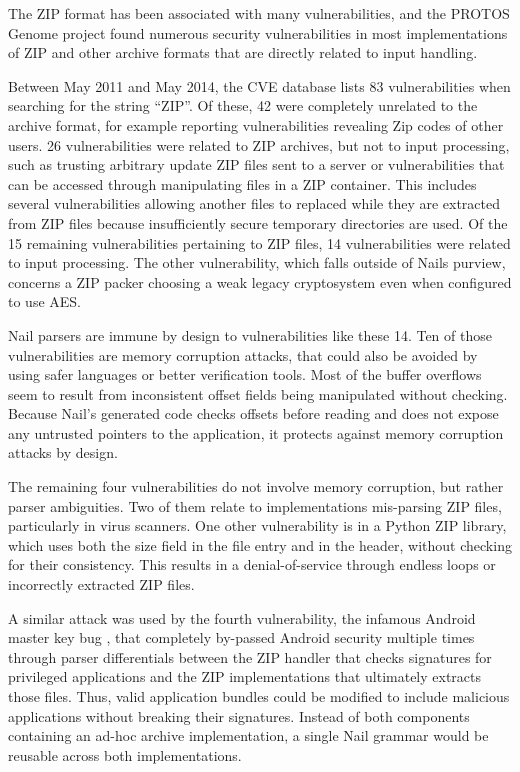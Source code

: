 The ZIP format has been associated with many vulnerabilities, and the PROTOS Genome project found numerous
security vulnerabilities in most implementations of ZIP and other archive formats that are directly
related to input handling.

Between May 2011 and May 2014, the CVE database\cite{cve-database} lists 83 vulnerabilities when searching for the
string ``ZIP''. Of these, 42 were completely unrelated to the archive format, for example reporting
vulnerabilities revealing Zip codes of other users. 26 vulnerabilities were related to ZIP archives,
but not to input processing, such as trusting arbitrary update ZIP files sent to a server or
vulnerabilities that can be accessed through manipulating files in a ZIP container. This includes
several vulnerabilities allowing another files to replaced while they are extracted from ZIP
files because insufficiently secure temporary directories are used. Of the 15 remaining
vulnerabilities pertaining to ZIP files, 14 vulnerabilities were related to input processing. The
 other vulnerability, which falls outside of Nails purview, concerns a ZIP packer choosing a weak
 legacy cryptosystem even when configured to use AES.

 Nail parsers are immune by design to vulnerabilities like these 14. Ten of those vulnerabilities
 are memory corruption attacks, that could also be avoided by using safer languages or better
 verification tools. Most of the buffer overflows seem to result from inconsistent offset fields
 being manipulated without checking. Because Nail's generated code checks offsets before reading and
 does not expose any untrusted pointers to the application, it protects against memory corruption
 attacks by design.

The remaining four vulnerabilities do not involve memory corruption, but rather parser ambiguities.
Two of them relate to implementations mis-parsing ZIP files, particularly in virus scanners. One
other vulnerability is in a Python ZIP library, which uses both the size field in the file entry and
in the header, without checking for their consistency. This results in a denial-of-service through
endless loops or incorrectly extracted ZIP files.

A similar attack was used by the fourth vulnerability, the infamous Android master key bug
\cite{saurik-masterkey}, that completely by-passed Android security multiple times through parser
differentials between the ZIP handler that checks signatures for privileged applications and the ZIP
implementations that ultimately extracts those files. Thus, valid  application bundles could be
modified to include malicious applications without breaking their signatures. Instead of both
components containing an ad-hoc archive implementation, a single Nail grammar would be reusable
across both implementations. 

